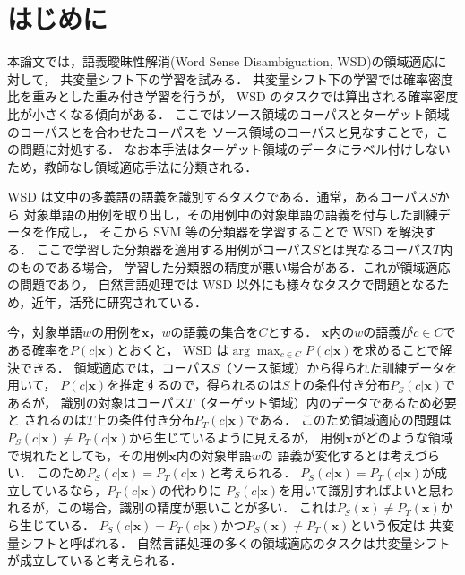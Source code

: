 \documentclass[japanese]{jnlp_1.4}
\begin{document}
\maketitle

\section{はじめに}

本論文では，語義曖昧性解消(Word Sense Disambiguation, WSD)の領域適応に対して，
共変量シフト下の学習を試みる．
共変量シフト下の学習では確率密度比を重みとした重み付き学習を行うが，
WSD のタスクでは算出される確率密度比が小さくなる傾向がある．
ここではソース領域のコーパスとターゲット領域のコーパスとを合わせたコーパスを
ソース領域のコーパスと見なすことで，この問題に対処する．
なお本手法はターゲット領域のデータにラベル付けしないため，教師なし領域適応手法に分類される．

WSD は文中の多義語の語義を識別するタスクである．通常，あるコーパス$S$から
対象単語の用例を取り出し，その用例中の対象単語の語義を付与した訓練データを作成し，
そこから SVM 等の分類器を学習することで WSD を解決する．
ここで学習した分類器を適用する用例がコーパス$S$とは異なるコーパス$T$内のものである場合，
学習した分類器の精度が悪い場合がある．これが領域適応の問題であり，
自然言語処理では WSD 以外にも様々なタスクで問題となるため，近年，活発に研究されている\cite{da-book,mori,kamishima}．

今，対象単語$w$の用例を${\bm x}$，$w$の語義の集合を$C$とする．
${\bm x}$内の$w$の語義が$c \in C$である確率を$P(c|{\bm x})$とおくと，
WSD は$\arg \max_{c \in C} P(c|{\bm x})$を求めることで解決できる．
領域適応では，コーパス$S$（ソース領域）から得られた訓練データを用いて，
$P(c|{\bm x})$を推定するので，得られるのは$S$上の条件付き分布$P_S (c|{\bm x})$であるが，
識別の対象はコーパス$T$（ターゲット領域）内のデータであるため必要と
されるのは$T$上の条件付き分布$P_T (c|{\bm x})$である．
このため領域適応の問題は$P_S (c|{\bm x}) \ne P_T (c|{\bm x})$から生じているように見えるが，
用例${\bm x}$がどのような領域で現れたとしても，その用例${\bm x}$内の対象単語$w$の
語義が変化するとは考えづらい．
このため$P_S (c|{\bm x}) = P_T (c|{\bm x})$と考えられる．
$P_S (c|{\bm x}) = P_T (c|{\bm x})$が成立しているなら，$P_T (c|{\bm x})$の代わりに
$P_S (c|{\bm x})$を用いて識別すればよいと思われるが，この場合，識別の精度が悪いことが多い．
これは$P_S ({\bm x}) \ne P_T ({\bm x})$から生じている．
$P_S (c|{\bm x}) = P_T (c|{\bm x})$かつ$P_S ({\bm x}) \ne P_T ({\bm x})$という仮定は
共変量シフトと呼ばれる\cite{sugiyama-book}．
自然言語処理の多くの領域適応のタスクは共変量シフトが成立していると考えられる\cite{da-book}．
\end{document}
